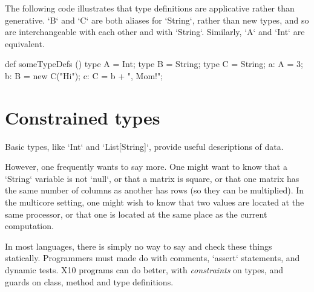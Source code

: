 The following code illustrates that type definitions are applicative rather
than generative.  \xcd`B` and \xcd`C` are both aliases for \xcd`String`,
rather than new types, and so are interchangeable with each other and with
\xcd`String`. Similarly, \xcd`A` and \xcd`Int` are equivalent.
\begin{xten}
def someTypeDefs () {
  type A = Int;
  type B = String;
  type C = String;
  a: A = 3;
  b: B = new C("Hi");
  c: C = b + ", Mom!";
  }
\end{xten}




\section{Constrained types}
\label{ConstrainedTypes}
\label{DepType:DepType}
\label{DepTypes}



Basic types, like \xcd`Int` and \xcd`List[String]`, provide useful
descriptions of data.  

However, one frequently wants to say more.  One might want to know
that a \xcd`String` variable is not \xcd`null`, or that a matrix is
square, or that one matrix has the same number of columns as another
has rows (so they can be multiplied).  In the multicore setting, one
might wish to know that two values are located at the same processor,
or that one is located at the same place as the current computation.

In most languages, there is simply no way to say and check these things
statically.  Programmers must made do with comments, \xcd`assert`
statements, and dynamic tests.  X10 programs can do better, with {\em
  constraints} on types, and guards on class, method and type
definitions.



